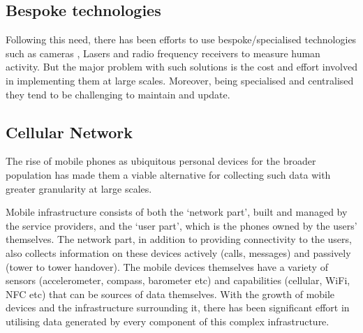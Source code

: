 \subsection{Bespoke technologies}

Following this need, there has been efforts to use bespoke/specialised technologies such as cameras \citep{cai1996, heikkila2004, krockel2012}, Lasers \citep{zhao2005, arras2008} and radio frequency receivers  \citep{bahl2000, yang2013, chothia2010, bulusu2000, dil2011} to measure human activity.
But the major problem with such solutions is the cost and effort involved in implementing them at large scales.
Moreover, being specialised and centralised they tend to be challenging to maintain and update.

\subsection{Cellular Network}

The rise of mobile phones as ubiquitous personal devices for the broader population has made them a viable alternative for collecting such data with greater granularity at large scales.

Mobile infrastructure consists of both the ‘network part’, built and managed by the service providers, and the ‘user part’, which is the phones owned by the users’ themselves.
The network part, in addition to providing connectivity to the users, also collects information on these devices actively (calls, messages) and passively (tower to tower handover).
The mobile devices themselves have a variety of sensors (accelerometer, compass, barometer etc) and capabilities (cellular, WiFi, NFC etc) that can be sources of data themselves.
With the growth of mobile devices and the infrastructure surrounding it, there has been significant effort in utilising data generated by every component of this complex infrastructure.


